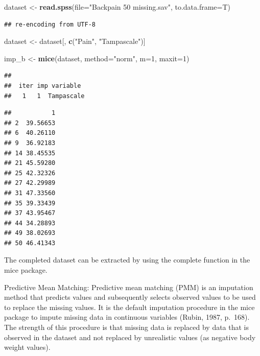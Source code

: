 \documentclass[]{book}
\newenvironment{Shaded}{\begin{snugshade}}{\end{snugshade}}
\newcommand{\KeywordTok}[1]{\textcolor[rgb]{0.13,0.29,0.53}{\textbf{#1}}}
\newcommand{\DataTypeTok}[1]{\textcolor[rgb]{0.13,0.29,0.53}{#1}}
\newcommand{\DecValTok}[1]{\textcolor[rgb]{0.00,0.00,0.81}{#1}}
\newcommand{\StringTok}[1]{\textcolor[rgb]{0.31,0.60,0.02}{#1}}
\newcommand{\CommentTok}[1]{\textcolor[rgb]{0.56,0.35,0.01}{\textit{#1}}}
\newcommand{\OperatorTok}[1]{\textcolor[rgb]{0.81,0.36,0.00}{\textbf{#1}}}
\newcommand{\NormalTok}[1]{#1}
\theoremstyle{definition}
\theoremstyle{definition}
\theoremstyle{definition}
\theoremstyle{remark}
\begin{document}
\begin{Shaded}
\begin{Highlighting}[]
\NormalTok{dataset <-}\StringTok{ }\KeywordTok{read.spss}\NormalTok{(}\DataTypeTok{file=}\StringTok{"Backpain 50 missing.sav"}\NormalTok{, }\DataTypeTok{to.data.frame=}\NormalTok{T)}
\end{Highlighting}
\end{Shaded}

\begin{verbatim}
## re-encoding from UTF-8
\end{verbatim}

\begin{Shaded}
\begin{Highlighting}[]
\NormalTok{dataset <-}\StringTok{ }\NormalTok{dataset[, }\KeywordTok{c}\NormalTok{(}\StringTok{"Pain"}\NormalTok{, }\StringTok{"Tampascale"}\NormalTok{)]}

\NormalTok{imp_b <-}\StringTok{ }\KeywordTok{mice}\NormalTok{(dataset, }\DataTypeTok{method=}\StringTok{"norm"}\NormalTok{, }\DataTypeTok{m=}\DecValTok{1}\NormalTok{, }\DataTypeTok{maxit=}\DecValTok{1}\NormalTok{)}
\end{Highlighting}
\end{Shaded}

\begin{verbatim}
## 
##  iter imp variable
##   1   1  Tampascale
\end{verbatim}

\begin{Shaded}
\end{Shaded}

\begin{verbatim}
##           1
## 2  39.56653
## 6  40.26110
## 9  36.92183
## 14 38.45535
## 21 45.59280
## 25 42.32326
## 27 42.29989
## 31 47.33560
## 35 39.33439
## 37 43.95467
## 44 34.28893
## 49 38.02693
## 50 46.41343
\end{verbatim}

The completed dataset can be extracted by using the complete function in
the mice package.

Predictive Mean Matching: Predictive mean matching (PMM) is an
imputation method that predicts values and subsequently selects observed
values to be used to replace the missing values. It is the default
imputation procedure in the mice package to impute missing data in
continuous variables (Rubin, 1987, p.~168). The strength of this
procedure is that missing data is replaced by data that is observed in
the dataset and not replaced by unrealistic values (as negative body
weight values).
\end{document}
